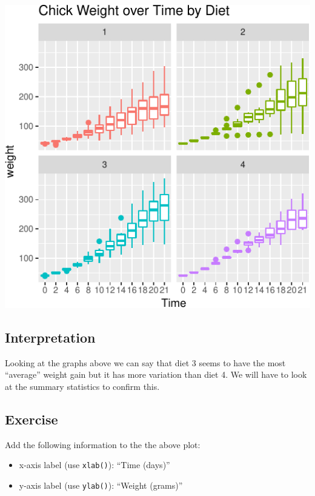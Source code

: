 \documentclass[a4paper,9pt,twocolumn,twoside,printwatermark=false]{pinp}
\providecommand{\tightlist}{%
  \setlength{\itemsep}{0pt}\setlength{\parskip}{0pt}}
\begin{document}
\begin{center}\includegraphics{Getting-Started-in-R_files/figure-latex/boxPlot-1} \end{center}

\subsection{Interpretation}\label{interpretation-4}

Looking at the graphs above we can say that diet 3 seems to have the
most ``average'' weight gain but it has more variation than diet 4. We
will have to look at the summary statistics to confirm this.

\subsection{Exercise}\label{exercise-7}

Add the following information to the the above plot:

\begin{itemize}
\tightlist
\item
  x-axis label (use \texttt{xlab()}): ``Time (days)''
\item
  y-axis label (use \texttt{ylab()}): ``Weight (grams)''
\end{itemize}
\end{document}
